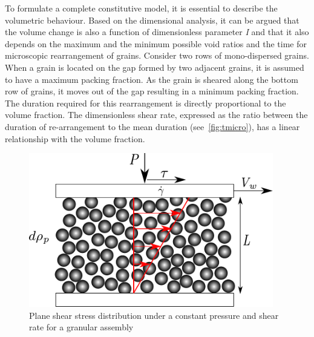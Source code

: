 To formulate a 
complete constitutive model, it is essential to describe the volumetric 
behaviour. Based on the dimensional analysis, it can be argued that the volume 
change is also a function of dimensionless parameter \textit{I} and that it 
also depends on the maximum and the minimum possible void ratios and the time 
for microscopic rearrangement of grains. Consider two rows of mono-dispersed 
grains. When a grain is located on the gap formed by two adjacent grains, it is 
assumed to have a maximum packing fraction. As the grain is sheared along the 
bottom row of grains, it moves out of the gap resulting in 
a minimum packing fraction. The duration required for this rearrangement is 
directly proportional to the volume fraction. The dimensionless shear rate, 
expressed as the ratio between the duration of re-arrangement to the mean 
duration (see~\cref{fig:tmicro}), has a linear relationship with the volume 
fraction.

\begin{figure}[tbhp]
\centering
\includegraphics[width=0.95\textwidth]{Rheology}
\caption{Plane shear stress distribution under a constant pressure and shear 
rate for a granular assembly}
\label{fig:rheology}
\end{figure}

